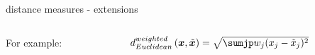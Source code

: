 \documentclass[11pt,compress,t,notes=noshow, xcolor=table]{beamer}
\begin{document}
\begin{vbframe}{distance measures - extensions}
\begin{columns}[T]
  \begin{column}{0.2\textwidth}
    For example:
  \end{column}
  \begin{column}{0.8\textwidth}
     $d^{weighted}_{Euclidean}\left(\xv, \tilde{\xv}\right) = \sqrt{\sumjp w_{j}(x_j- \tilde{x}_j)^2}$
  \end{column}
\end{columns}

\vfill

\end{vbframe}






\endlecture
\end{document}
